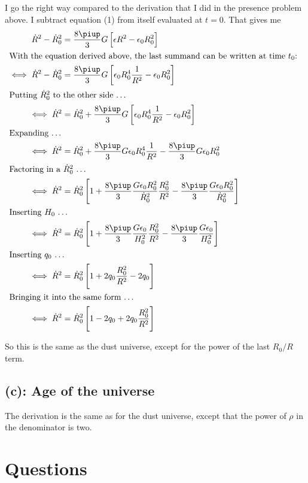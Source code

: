 I go the right way compared to the derivation that I did in the presence
problem above. I subtract equation (1) from itself evaluated at $t=0$. That
gives me
\begin{align*}
    \dot R^2 - \dot R_0^2 &= \frac{8\piup}3 G \sbr{\epsilon R^2 - \epsilon_0 R_0^2} \\
    \intertext{%
        With the equation derived above, the last summand can be written at time
        $t_0$:
    }
    \iff \dot R^2 - \dot R_0^2 &= \frac{8\piup}3 G \sbr{\epsilon_0 R_0^4
\frac{1}{R^2} - \epsilon_0 R_0^2} \\
    \intertext{%
        Putting $\dot R_0^2$ to the other side …
    }
    \iff \dot R^2 &= \dot R_0^2 + \frac{8\piup}3 G \sbr{\epsilon_0 R_0^4
\frac{1}{R^2} - \epsilon_0 R_0^2} \\
    \intertext{%
        Expanding …
    }
    \iff \dot R^2 &= \dot R_0^2 + \frac{8\piup}3 G \epsilon_0 R_0^4
    \frac{1}{R^2} - \frac{8\piup}3 G \epsilon_0 R_0^2 \\
    \intertext{%
        Factoring in a $\dot R_0^2$ …
    }
    \iff \dot R^2 &= \dot R_0^2 \sbr{1 + \frac{8\piup}3 \frac{G \epsilon_0
    R_0^2}{\dot R_0^2} \frac{R_0^2}{R^2} - \frac{8\piup}3 \frac{G \epsilon_0
    R_0^2}{\dot R_0^2}} \\
    \intertext{%
        Inserting $H_0$ …
    }
    \iff \dot R^2 &= \dot R_0^2 \sbr{1 + \frac{8\piup}3 \frac{G \epsilon_0}{H_0^2} \frac{R_0^2}{R^2} - \frac{8\piup}3 \frac{G \epsilon_0}{H_0^2}} \\
    \intertext{%
        Inserting $q_0$ …
    }
    \iff \dot R^2 &= \dot R_0^2 \sbr{1 + 2q_0 \frac{R_0^2}{R^2} - 2q_0} \\
    \intertext{%
        Bringing it into the same form …
    }
    \iff \dot R^2 &= \dot R_0^2 \sbr{1 - 2q_0 + 2q_0 \frac{R_0^2}{R^2}}
\end{align*}

So this is the same as the dust universe, except for the power of the last
$R_0/R$ term.

\subsection*{(c): Age of the universe}

The derivation is the same as for the dust universe, except that the power of
$\rho$ in the denominator is two.

\section*{Questions}

